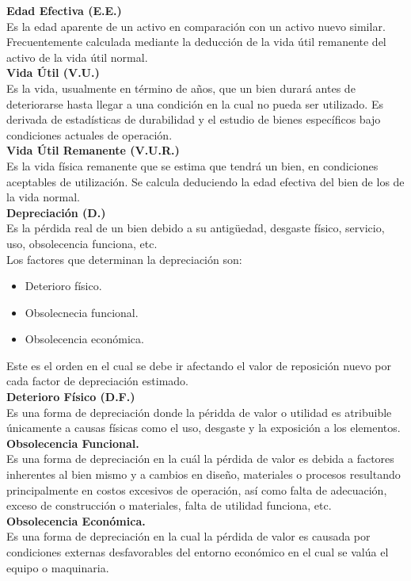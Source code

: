\textbf{Edad Efectiva (E.E.)} \\ 
Es la edad aparente de un activo en comparación con un activo nuevo similar. Frecuentemente calculada mediante la deducción de la vida útil remanente del activo de la vida útil normal. \\[6mm]
\textbf{Vida Útil (V.U.)} \\ 
Es la vida, usualmente en término de años, que un bien durará antes de deteriorarse hasta llegar a una condición en la cual no pueda ser utilizado.
Es derivada de estadísticas de durabilidad y el estudio de bienes específicos bajo condiciones actuales de operación. \\[6mm] 
\textbf{Vida Útil Remanente (V.U.R.)} \\ 
Es la vida física remanente que se estima que tendrá un bien, en condiciones aceptables de utilización.
Se calcula deduciendo la edad efectiva del bien de los de la vida normal. \\[6mm] 
\textbf{Depreciación (D.)} \\ 
Es la pérdida real de un bien debido a su antigüedad, desgaste físico, servicio, uso, obsolecencia funciona, etc. \\ 
Los factores que determinan la depreciación son:
\begin{itemize}
	\item Deterioro físico.
	\item Obsolecnecia funcional.
	\item Obsolecencia económica.
\end{itemize}
Este es el orden en el cual se debe ir afectando el valor de reposición nuevo por cada factor de depreciación estimado. \\[6mm] 
\textbf{Deterioro Físico  (D.F.)} \\ 
Es una forma de depreciación donde la péridda de valor o utilidad es atribuible únicamente a causas físicas como el uso, desgaste y la exposición a los elementos. \\[6mm] 
\textbf{Obsolecencia Funcional.} \\ 
Es una forma de depreciación en la cuál la pérdida de valor es debida a factores inherentes al bien mismo y a cambios en diseño, materiales o procesos resultando principalmente en costos excesivos de operación, así como falta de adecuación, exceso de construcción o materiales, falta de utilidad funciona, etc. \\[6mm] 
\textbf{Obsolecencia Económica.} \\ 
Es una forma de depreciación en la cual la pérdida de valor es causada por condiciones externas desfavorables del entorno económico en el cual se valúa el equipo o maquinaria. \\[6mm] 
